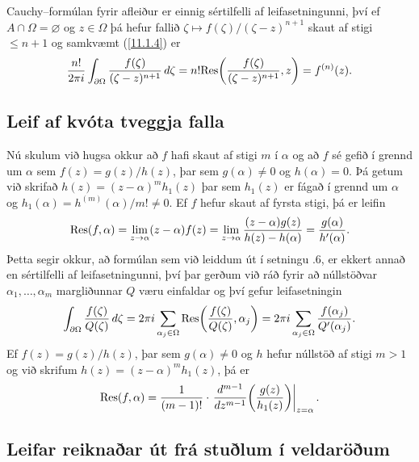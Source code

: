 Cauchy--formúlan fyrir afleiður er einnig sértilfelli af
leifasetningunni, því ef $A\cap \Omega=\varnothing$ og $z\in \Omega$
þá hefur fallið $\zeta\mapsto f(\zeta)/(\zeta-z)^{n+1}$ skaut af
stigi $\leq n+1$ og samkvæmt (\ref{11.1.4}) er 
 $$\dfrac{n!}{2\pi i}
\int_{\partial\Omega}\dfrac{f(\zeta)}{(\zeta-z)^{n+1}}\, d\zeta = 
{n!} {\operatorname{Res}}\bigg(\dfrac{f(\zeta)}{(\zeta-z)^{n+1}},z\bigg) =
f^{(n)}(z).
 $$

\subsection*{Leif af kvóta tveggja falla}


Nú skulum  við hugsa okkur að $f$ hafi skaut af stigi  $m$ í
$\alpha$ og að $f$ sé gefið í 
grennd um $\alpha$ sem $f(z)=g(z)/h(z)$, þar sem $g(\alpha)\neq
0$ og $h(\alpha)=0$.  Þá getum við skrifað $h(z)=(z-\alpha)^mh_1(z)$ þar
sem $h_1(z)$ er fágað í grennd um $\alpha$ og
$h_1(\alpha)=h^{(m)}(\alpha)/m!\neq 0$. Ef  $f$ hefur skaut af fyrsta
stigi, þá er leifin 
 \begin{equation*}{\operatorname{Res}}(f,\alpha)= \lim_{z\to \alpha}(z-\alpha) f(z)
=\lim_{z\to \alpha} 
\dfrac{(z-\alpha)g(z)}{h(z)-h(\alpha)}=\dfrac{g(\alpha)}{h{\sp{\prime}}(\alpha)}.
\label{11.1.6}
 \end{equation*}
Þetta segir okkur, að 
formúlan sem við leiddum út í setningu .6, 
er ekkert annað en sértilfelli af leifasetningunni, því þar gerðum við 
ráð fyrir að núllstöðvar $\alpha_1,\dots,\alpha_m$ margliðunnar $Q$
væru einfaldar og því gefur leifasetningin
 $$\int_{\partial\Omega}\dfrac{f(\zeta)}{Q(\zeta)}\, d\zeta
=  2\pi i\sum_{\alpha_j\in \Omega}
{\operatorname{Res}}\bigg(\dfrac{f(\zeta)}{Q(\zeta)}, \alpha_j\bigg) 
=  2\pi i\sum_{\alpha_j\in \Omega} \dfrac{f(\alpha_j)}{Q{\sp{\prime}}(\alpha_j)}.
 $$
Ef $f(z)=g(z)/h(z)$, þar sem $g(\alpha)\neq
0$ og $h$ hefur núllstöð af stigi  $m>1$ og við skrifum
$h(z)=(z-{\alpha})^mh_1(z)$, þá er
 \begin{equation*}{\operatorname{Res}}(f,\alpha)=\dfrac 1{(m-1)!}\cdot
\left.\dfrac {d^{m-1}}{dz^{m-1}}\bigg(\dfrac
{g(z)}{h_1(z)}\bigg)\right|_{z=\alpha}. \label{11.1.7}
 \end{equation*}


\subsection*{Leifar reiknaðar út frá stuðlum í veldaröðum}

